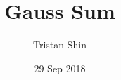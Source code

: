 \documentclass[a4paper, 12pt]{article}
\title{Gauss Sum}
\author{Tristan Shin}
\date{29 Sep 2018}
\begin{document}
\maketitle


\hrulefill

\begin{solution}
\end{solution}
\end{document}
